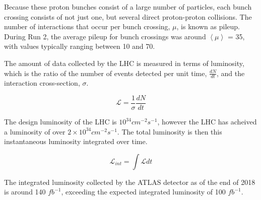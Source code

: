 Because these proton bunches consist of a large number of particles, each bunch crossing consists of not just one, but several direct proton-proton collisions. The number of interactions that occur per bunch crossing, $\mu$, is known as pileup. During Run 2, the average pileup for bunch crossings was around $\left\langle\mu\right\rangle$ = 35, with values typically ranging between 10 and 70.

The amount of data collected by the LHC is measured in terms of luminosity, which is the ratio of the number of events detected per unit time, $\frac{dN}{dt}$, and the interaction cross-section, $\sigma$. 

\begin{equation}                                                                                                                                
        \label{eq:lumiDef}                                                                                                                      
        \mathcal{L} = \frac{1}{\sigma}\frac{dN}{dt}
\end{equation}

The design luminosity of the LHC is $10^{34} cm^{-2}s^{-1}$, however the LHC has acheived a luminosity of over $2\times 10^34 cm^{-2}s^{-1}$. The total luminosity is then this instantaneous luminosity integrated over time.

\begin{equation}
        \label{eq:intLumi}      
        \mathcal{L}_{int} = \int\mathcal{L}dt
\end{equation}

The integrated luminosity collected by the ATLAS detector as of the end of 2018 is around 140 $fb^{-1}$, exceeding the expected integrated luminosity of 100 $fb^{-1}$.
                                            
                                         
